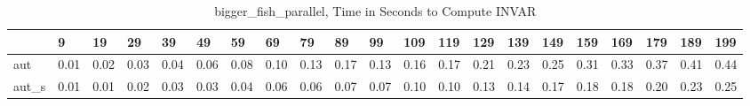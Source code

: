 \begin{table}
\caption{bigger_fish_parallel, Time in Seconds to Compute INVAR}
\label{bigger_fish_parallel_INVAR_time}
\begin{tabular}{lllllllllllllllllllll}
\toprule
 & 9 & 19 & 29 & 39 & 49 & 59 & 69 & 79 & 89 & 99 & 109 & 119 & 129 & 139 & 149 & 159 & 169 & 179 & 189 & 199 \\
\midrule
aut & 0.01 & 0.02 & 0.03 & 0.04 & 0.06 & 0.08 & 0.10 & 0.13 & 0.17 & 0.13 & 0.16 & 0.17 & 0.21 & 0.23 & 0.25 & 0.31 & 0.33 & 0.37 & 0.41 & 0.44 \\
aut_s & 0.01 & 0.01 & 0.02 & 0.03 & 0.03 & 0.04 & 0.06 & 0.06 & 0.07 & 0.07 & 0.10 & 0.10 & 0.13 & 0.14 & 0.17 & 0.18 & 0.18 & 0.20 & 0.23 & 0.25 \\
\bottomrule
\end{tabular}
\end{table}
